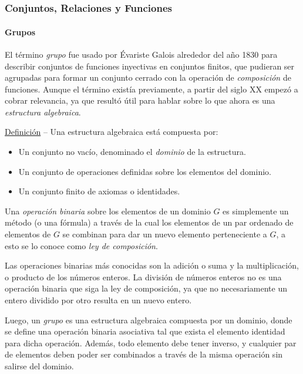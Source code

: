 \documentclass[../main.tex]{subfiles}
\begin{document}
\part[Teoría]{}
\section{Conjuntos, Relaciones y Funciones} {
    \subsection{Grupos}  { \cite{gallian}
        El término \textit{grupo} fue usado por Évariste Galois alrededor del año 1830 para describir conjuntos de funciones inyectivas en conjuntos finitos, que pudieran ser agrupadas para formar un conjunto cerrado con la operación de \textit{composición} de funciones. Aunque el término existía previamente, a partir del siglo XX empezó a cobrar relevancia, ya que resultó útil para hablar sobre lo que ahora es una \textit{estructura algebraica}.
        
        \nln
        \ul{Definición} -- Una estructura algebraica está compuesta por:
        \begin{itemize}
            \item Un conjunto no vacío, denominado el \textit{dominio} de la estructura.
            \item Un conjunto de operaciones definidas sobre los elementos del dominio.
            \item Un conjunto finito de axiomas o identidades.
        \end{itemize}
        
        Una \textit{operación binaria} sobre los elementos de un dominio $G$ es simplemente un método (o una fórmula) a través de la cual los elementos de un par ordenado de elementos de $G$ se combinan para dar un nuevo elemento perteneciente a $G$, a esto se lo conoce como \textit{ley de composición}.
        
        \nln
        Las operaciones binarias más conocidas son la adición o suma y la multiplicación, o producto de los números enteros. La división de números enteros no es una operación binaria que siga la ley de composición, ya que no necesariamente un entero dividido por otro resulta en un nuevo entero.
        
        \nln
        Luego, un \textit{grupo} es una estructura algebraica compuesta por un dominio, donde se define una operación binaria asociativa tal que exista el elemento identidad para dicha operación. Además, todo elemento debe tener inverso, y cualquier par de elementos deben poder ser combinados a través de la misma operación sin salirse del dominio. 
        
}}
\end{document}

